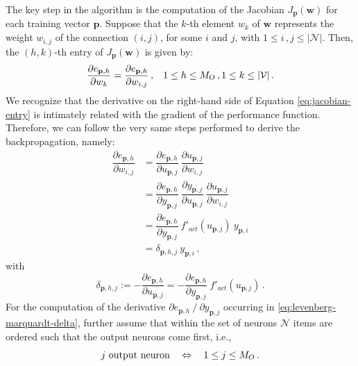 \documentclass[12pt, a4paper, twoside, openright]{report}
\numberwithin{equation}{chapter}
\theoremstyle{theorem}
\theoremstyle{definition}
\theoremstyle{remark}
\theoremstyle{proposition}
\numberwithin{figure}{chapter}
\begin{document}
		The key step in the algorithm is the computation of the Jacobian $J_{\mathbf{p}}(\mathbf{w})$ for each training vector $\mathbf{p}$. Suppose that the $k$-th element $w_k$ of $\mathbf{w}$ represents the weight $w_{i,j}$ of the connection $(i,j)$, for some $i$ and $j$, with $1 \leq i \, , j \leq |\mathcal{N}|$. Then, the $(h,k)$-th entry of $J_{\mathbf{p}}(\mathbf{w})$ is given by:
		\begin{equation}
			\label{eq:jacobian-entry}
			\dfrac{\partial e_{\mathbf{p},h}}{\partial w_k} = \dfrac{\partial e_{\mathbf{p},h}}{\partial w_{i,j}} \, , \hspace*{0.3cm} 1 \leq h \leq M_O \, , 1 \leq k \leq |\mathcal{V}| \, .
		\end{equation}
		We recognize that the derivative on the right-hand side of Equation \eqref{eq:jacobian-entry} is intimately related with the gradient of the performance function. Therefore, we can follow the very same steps performed to derive the backpropagation, namely:
		\begin{equation}
			\label{eq:jacobian-entry-equation}
			\begin{aligned}
				\dfrac{\partial e_{\mathbf{p},h}}{\partial w_{i,j}} & = \dfrac{\partial e_{\mathbf{p},h}}{\partial u_{\mathbf{p},j}} ~ \dfrac{\partial u_{\mathbf{p},j}}{\partial w_{i,j}} \\[0.1cm]
				& = \dfrac{\partial e_{\mathbf{p},h}}{\partial y_{\mathbf{p},j}} ~ \dfrac{\partial y_{\mathbf{p},j}}{\partial u_{\mathbf{p},j}} ~ \dfrac{\partial u_{\mathbf{p},j}}{\partial w_{i,j}} \\[0.1cm]
				& = \dfrac{\partial e_{\mathbf{p},h}}{\partial y_{\mathbf{p},j}} ~ f'_{act}(u_{\mathbf{p},j}) ~ y_{\mathbf{p},i} \\
				& = \delta_{\mathbf{p},h,j} ~ y_{\mathbf{p},i} \, ,
			\end{aligned}
		\end{equation} 
		with
		\begin{equation}
			\label{eq:levenberg-marquardt-delta}
			\delta_{\mathbf{p},h,j} := - \dfrac{\partial e_{\mathbf{p},h}}{\partial u_{\mathbf{p},j}} = - \dfrac{\partial e_{\mathbf{p},h}}{\partial y_{\mathbf{p},j}} ~ f'_{act}(u_{\mathbf{p},j}) \, .
		\end{equation}
		For the computation of the derivative $\partial e_{\mathbf{p},h} ~ / ~ \partial y_{\mathbf{p},j}$ occurring in \eqref{eq:levenberg-marquardt-delta}, further assume that within the set of neurons $\mathcal{N}$ items are ordered such that the output neurons come first, i.e.,
		\begin{equation*}
			\text{$j$ output neuron \hspace*{0.2cm} $\Leftrightarrow$ \hspace*{0.2cm} $1 \leq j \leq M_O$} \, .
		\end{equation*} 
\end{document}
